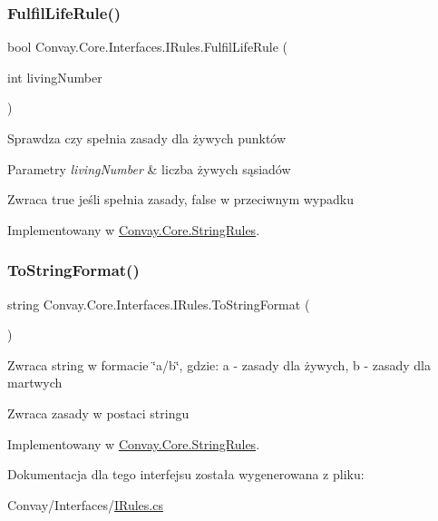 \subsubsection{\texorpdfstring{Fulfil\+Life\+Rule()}{FulfilLifeRule()}}
{\footnotesize\ttfamily bool Convay.\+Core.\+Interfaces.\+I\+Rules.\+Fulfil\+Life\+Rule (\begin{DoxyParamCaption}\item[{int}]{living\+Number }\end{DoxyParamCaption})}



Sprawdza czy spełnia zasady dla żywych punktów 


\begin{DoxyParams}{Parametry}
{\em living\+Number} & liczba żywych sąsiadów\\
\hline
\end{DoxyParams}
\begin{DoxyReturn}{Zwraca}
true jeśli spełnia zasady, false w przeciwnym wypadku
\end{DoxyReturn}


Implementowany w \hyperlink{class_convay_1_1_core_1_1_string_rules_abe8f44d51271581b0923aacf768b71ba}{Convay.\+Core.\+String\+Rules}.

\hypertarget{interface_convay_1_1_core_1_1_interfaces_1_1_i_rules_a7863e051cf9285ab1ef5b888c74d5018}{}\label{interface_convay_1_1_core_1_1_interfaces_1_1_i_rules_a7863e051cf9285ab1ef5b888c74d5018} 
\subsubsection{\texorpdfstring{To\+String\+Format()}{ToStringFormat()}}
{\footnotesize\ttfamily string Convay.\+Core.\+Interfaces.\+I\+Rules.\+To\+String\+Format (\begin{DoxyParamCaption}{ }\end{DoxyParamCaption})}



Zwraca string w formacie \char`\"{}a/b\char`\"{}, gdzie\+: a -\/ zasady dla żywych, b -\/ zasady dla martwych 

\begin{DoxyReturn}{Zwraca}
zasady w postaci stringu
\end{DoxyReturn}


Implementowany w \hyperlink{class_convay_1_1_core_1_1_string_rules_a4ecd053bf61402f58c6d40bf1e368a8a}{Convay.\+Core.\+String\+Rules}.



Dokumentacja dla tego interfejsu została wygenerowana z pliku\+:\begin{DoxyCompactItemize}
\item 
Convay/\+Interfaces/\hyperlink{_i_rules_8cs}{I\+Rules.\+cs}\end{DoxyCompactItemize}
